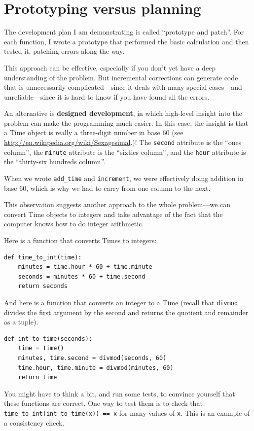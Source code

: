 \documentclass[10pt]{book}
\begin{document}
\section{Prototyping versus planning}
\label{prototype}

The development plan I am demonstrating is called ``prototype and
patch''.  For each function, I wrote a prototype that performed the
basic calculation and then tested it, patching errors along the
way.

This approach can be effective, especially if you don't yet have a
deep understanding of the problem.  But incremental corrections can
generate code that is unnecessarily complicated---since it deals with
many special cases---and unreliable---since it is hard to know if you
have found all the errors.

An alternative is {\bf designed development}, in which high-level
insight into the problem can make the programming much easier.  In
this case, the insight is that a Time object is really a three-digit
number in base 60 (see \url{http://en.wikipedia.org/wiki/Sexagesimal}.)!  The
{\tt second} attribute is the ``ones column'', the {\tt minute}
attribute is the ``sixties column'', and the {\tt hour} attribute is
the ``thirty-six hundreds column''.

When we wrote \verb"add_time" and {\tt increment}, we were effectively
doing addition in base 60, which is why we had to carry from one
column to the next.

This observation suggests another approach to the whole problem---we
can convert Time objects to integers and take advantage of the fact
that the computer knows how to do integer arithmetic.

Here is a function that converts Times to integers:

\begin{verbatim}
def time_to_int(time):
    minutes = time.hour * 60 + time.minute
    seconds = minutes * 60 + time.second
    return seconds
\end{verbatim}
%
And here is a function that converts an integer to a Time
(recall that {\tt divmod} divides the first argument by the second
and returns the quotient and remainder as a tuple).

\begin{verbatim}
def int_to_time(seconds):
    time = Time()
    minutes, time.second = divmod(seconds, 60)
    time.hour, time.minute = divmod(minutes, 60)
    return time
\end{verbatim}
%
You might have to think a bit, and run some tests, to convince
yourself that these functions are correct.  One way to test them is to
check that \verb"time_to_int(int_to_time(x)) == x" for many values of
{\tt x}.  This is an example of a consistency check.
\end{document}
